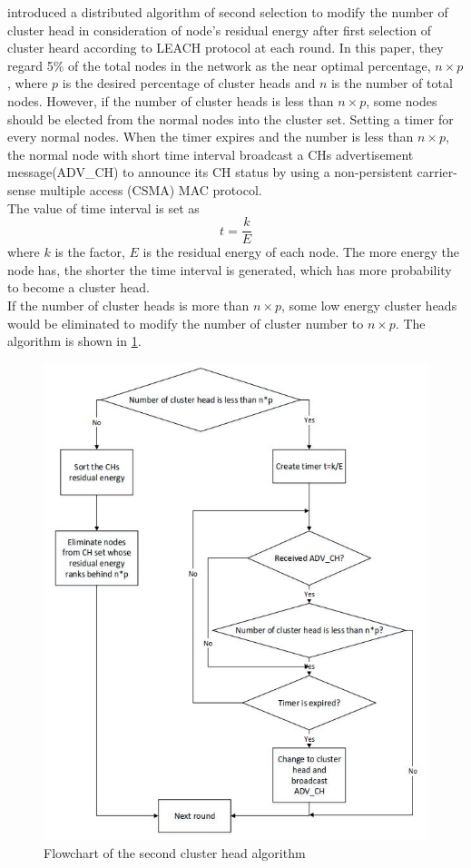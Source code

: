 \documentclass[11pt]{report}
\begin{document}
	\cite{5601113} introduced a distributed algorithm of second selection to modify the number of cluster head in consideration of node's residual energy after first selection of cluster heard according to LEACH protocol at each round. In this paper, they regard 5$\%$ of the total nodes in the network as the near optimal percentage, $n \times p$, where $p$ is the desired percentage of cluster heads  and $n$ is the number of total nodes. However, if the number of cluster heads is less than $n \times p$, some nodes should be elected from the normal nodes into the cluster set. Setting a timer for every normal nodes. When the timer expires and the number is less than $n \times p$, the normal node with short time interval broadcast a CHs advertisement message(ADV\_CH) to announce its CH status by using a non-persistent carrier-sense multiple access (CSMA) MAC protocol.\\
	The value of time interval is set as 
	\begin{equation}
	t = \frac{k}{E}
	\end{equation} 
	where $k$ is the factor, $E$ is the residual energy of each node. The more energy the node has, the shorter the time interval is generated, which has more probability to become a cluster head.\\
	If the number of cluster heads is more than $n\times p$, some low energy cluster heads would be eliminated to modify the number of cluster number to $n \times p$. The algorithm is shown in \ref{fig1}. 
	
	\begin{figure}[h!]
		\centering
		\includegraphics[width=0.8\linewidth]{1st.jpg}
		\caption{Flowchart of the second cluster head algorithm}
		\label{fig1}
	\end{figure}\\
	
\end{document}
